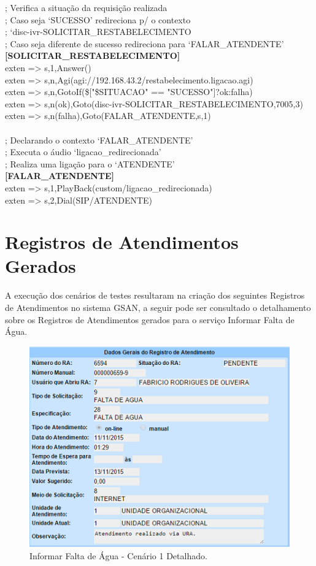 \begin{anexosenv}
; Verifica a situação da requisição realizada \\
; Caso seja ‘SUCESSO’ redireciona p/ o contexto \\
; ‘disc-ivr-SOLICITAR\_RESTABELECIMENTO \\
; Caso seja diferente de sucesso redireciona para ‘FALAR\_ATENDENTE’ \\
\textbf{[SOLICITAR\_RESTABELECIMENTO]} \\
exten => s,1,Answer() \\
exten => s,n,Agi(agi://192.168.43.2/restabelecimento.ligacao.agi) \\
exten => s,n,GotoIf(\$["\${SITUACAO}" == "SUCESSO"]?ok:falha) \\
exten => s,n(ok),Goto(disc-ivr-SOLICITAR\_RESTABELECIMENTO,7005,3) \\
exten => s,n(falha),Goto(FALAR\_ATENDENTE,s,1) \\
 \\
; Declarando o contexto ‘FALAR\_ATENDENTE’ \\
; Executa o áudio ‘ligacao\_redirecionada’ \\
; Realiza uma ligação para o ‘ATENDENTE’ \\
\textbf{[FALAR\_ATENDENTE]} \\
exten => s,1,PlayBack(custom/ligacao\_redirecionada) \\
exten => s,2,Dial(SIP/ATENDENTE) \\


\chapter{Registros de Atendimentos Gerados}

A execução dos cenários de testes resultaram na criação dos seguintes Registros de Atendimentos no sistema GSAN,
a seguir pode ser consultado o detalhamento sobre os Registros de Atendimentos gerados para o serviço Informar Falta de Água.
\begin{figure}[H]
	\centering
	\caption{Informar Falta de Água - Cenário 1 Detalhado.}
	\includegraphics{figuras/anexo/falta_agua/detalhe_1.png}
\end{figure}


\end{anexosenv}
